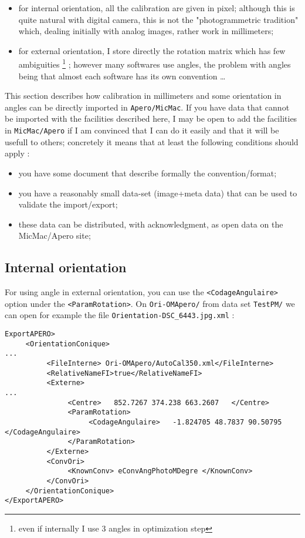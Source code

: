 \begin{itemize}
    \item for internal orientation, all the calibration are given in pixel;
          although this is quite natural with digital camera, this is
          not the "photogrammetric tradition" which, dealing initially with
          analog images, rather work in millimeters;

    \item for external orientation, I store directly the rotation matrix which
          has few ambiguities \footnote{even if internally I use $3$ angles in 
          optimization step} ; however many softwares use angles, the problem
          with angles being that almost each software has its own convention \dots
\end{itemize}

This section describes how calibration in millimeters and some orientation in angles
can be directly imported in {\tt Apero/MicMac}. If you have data that cannot be
imported with the facilities described here, I may be open to add the facilities in
{\tt MicMac/Apero} if I am convinced that I can do it easily and that it will 
be usefull to others; concretely it means that at least the following conditions should apply :

\begin{itemize}
      \item  you have some document that describe formally the convention/format;
      \item  you have a reasonably small data-set (image+meta data) that can  be used
             to validate the import/export;
      \item  these data can be distributed, with acknowledgment, as open data on the 
             MicMac/Apero site;
\end{itemize}

\subsection{Internal orientation}

For using angle in external orientation, you can use the {\tt  <CodageAngulaire> }
option under the {\tt <ParamRotation>}. On {\tt Ori-OMApero/} from data set
{\tt TestPM/} we can open for example the file {\tt Orientation-DSC\_6443.jpg.xml} :

\begin{verbatim}
ExportAPERO>
     <OrientationConique>
...
          <FileInterne> Ori-OMApero/AutoCal350.xml</FileInterne>
          <RelativeNameFI>true</RelativeNameFI>
          <Externe>
...
               <Centre>   852.7267 374.238 663.2607   </Centre>
               <ParamRotation>
                    <CodageAngulaire>   -1.824705 48.7837 90.50795 </CodageAngulaire>
               </ParamRotation>
          </Externe>
          <ConvOri>
               <KnownConv> eConvAngPhotoMDegre </KnownConv>
          </ConvOri>
     </OrientationConique>
</ExportAPERO>

\end{verbatim}


